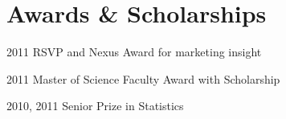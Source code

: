 \documentclass{tccv}
\begin{document}

\section{Awards \& Scholarships}

\begin{yearlist}
\item{2011}
     {RSVP and Nexus Award \newline for marketing insight}
     {}
\item{2011}
     {Master of Science Faculty Award with Scholarship}
     {}

\item{2010, 2011}
     {Senior Prize in Statistics}
     {}
\end{yearlist}


\end{document}
